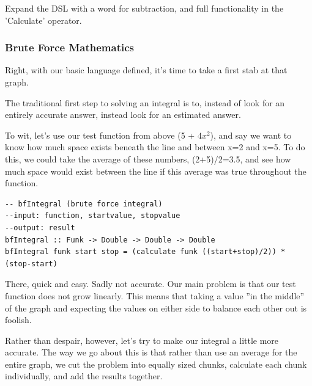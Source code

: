 \begin{exercise}
Expand the DSL with a word for subtraction, and full functionality in the 'Calculate' operator. 
\end{exercise}
\fi

\subsubsection{Brute Force Mathematics}
Right, with our basic language defined, it's time to take a first stab at that graph.

The traditional first step to solving an integral is to, instead of look for an entirely accurate answer, instead look for an estimated answer.

To wit, let's use our test function from above (5 + $4x^2$), and say we want to know how much space exists beneath the line and between x=2 and x=5. To do this, we could take the average of these numbers, (2+5)/2=3.5, and see how much space would exist between the line if this average was true throughout the function.
\begin{verbatim}
-- bfIntegral (brute force integral)
--input: function, startvalue, stopvalue
--output: result
bfIntegral :: Funk -> Double -> Double -> Double
bfIntegral funk start stop = (calculate funk ((start+stop)/2)) * (stop-start)
\end{verbatim}

There, quick and easy. Sadly not accurate. Our main problem is that our test function does not grow linearly. This means that taking a value ''in the middle'' of the graph and expecting the values on either side to balance each other out is foolish.

Rather than despair, however, let's try to make our integral a little more accurate. The way we go about this is that rather than use an average for the entire graph, we cut the problem into equally sized chunks, calculate each chunk individually, and add the results together.

